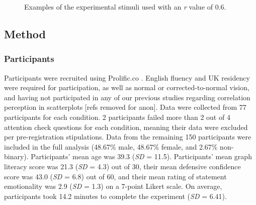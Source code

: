 \documentclass[manuscript,screen,review,anonymous]{acmart}
\begin{document}
\begin{figure}


\caption{\label{fig-main-examples}Examples of the experimental stimuli
used with an \textit{r} value of 0.6.}

\end{figure}%

\subsection{Method}\label{sec-method-main}

\subsubsection{Participants}\label{sec-participants-main}

Participants were recruited using Prolific.co \citep{prolific}. English
fluency and UK residency were required for participation, as well as
normal or corrected-to-normal vision, and having not participated in any
of our previous studies regarding correlation perception in scatterplots
{[}refs removed for anon{]}. Data were collected from 77 participants
for each condition. 2 participants failed more than 2 out of 4 attention
check questions for each condition, meaning their data were excluded per
pre-registration stipulations. Data from the remaining 150 participants
were included in the full analysis (48.67\% male, 48.67\% female, and
2.67\% non-binary). Participants' mean age was 39.3 (\emph{SD} = 11.5).
Participants' mean graph literacy score was 21.3 (\emph{SD} = 4.3) out
of 30, their mean defensive confidence score was 43.0 (\emph{SD} = 6.8)
out of 60, and their mean rating of statement emotionality was 2.9
(\emph{SD} = 1.3) on a 7-point Likert scale. On average, participants
took 14.2 minutes to complete the experiment (\emph{SD} = 6.41).
\end{document}
